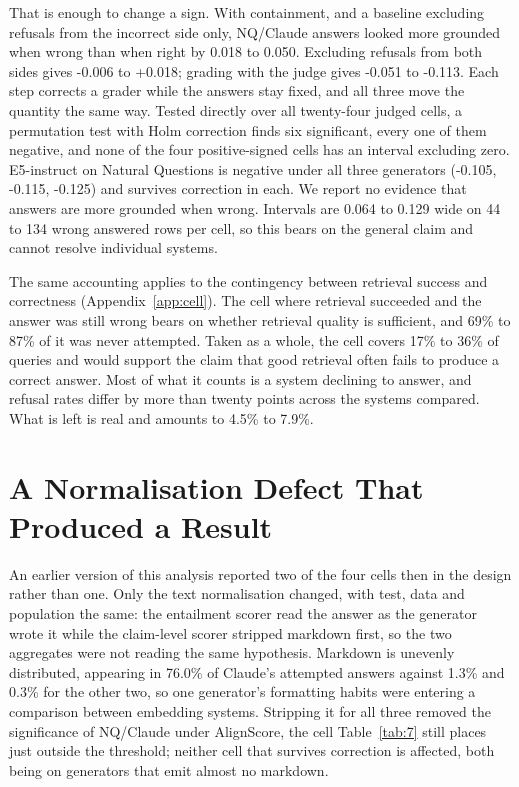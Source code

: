 \documentclass[11pt]{article}
\begin{document}
That is enough to change a sign. With containment, and a baseline excluding refusals from the incorrect side only, NQ/Claude answers looked more grounded when wrong than when right by 0.018 to 0.050. Excluding refusals from both sides gives -0.006 to +0.018; grading with the judge gives -0.051 to -0.113. Each step corrects a grader while the answers stay fixed, and all three move the quantity the same way. Tested directly over all twenty-four judged cells, a permutation test with Holm correction finds six significant, every one of them negative, and none of the four positive-signed cells has an interval excluding zero. E5-instruct on Natural Questions is negative under all three generators (-0.105, -0.115, -0.125) and survives correction in each. We report no evidence that answers are more grounded when wrong. Intervals are 0.064 to 0.129 wide on 44 to 134 wrong answered rows per cell, so this bears on the general claim and cannot resolve individual systems.

The same accounting applies to the contingency between retrieval success and correctness (Appendix~\ref{app:cell}). The cell where retrieval succeeded and the answer was still wrong bears on whether retrieval quality is sufficient, and 69\% to 87\% of it was never attempted. Taken as a whole, the cell covers 17\% to 36\% of queries and would support the claim that good retrieval often fails to produce a correct answer. Most of what it counts is a system declining to answer, and refusal rates differ by more than twenty points across the systems compared. What is left is real and amounts to 4.5\% to 7.9\%.

\section{A Normalisation Defect That Produced a Result}
\label{sec:normalisation}

An earlier version of this analysis reported two of the four cells then in the design rather than one. Only the text normalisation changed, with test, data and population the same: the entailment scorer read the answer as the generator wrote it while the claim-level scorer stripped markdown first, so the two aggregates were not reading the same hypothesis. Markdown is unevenly distributed, appearing in 76.0\% of Claude's attempted answers against 1.3\% and 0.3\% for the other two, so one generator's formatting habits were entering a comparison between embedding systems. Stripping it for all three removed the significance of NQ/Claude under AlignScore, the cell Table~\ref{tab:7} still places just outside the threshold; neither cell that survives correction is affected, both being on generators that emit almost no markdown.
\end{document}
